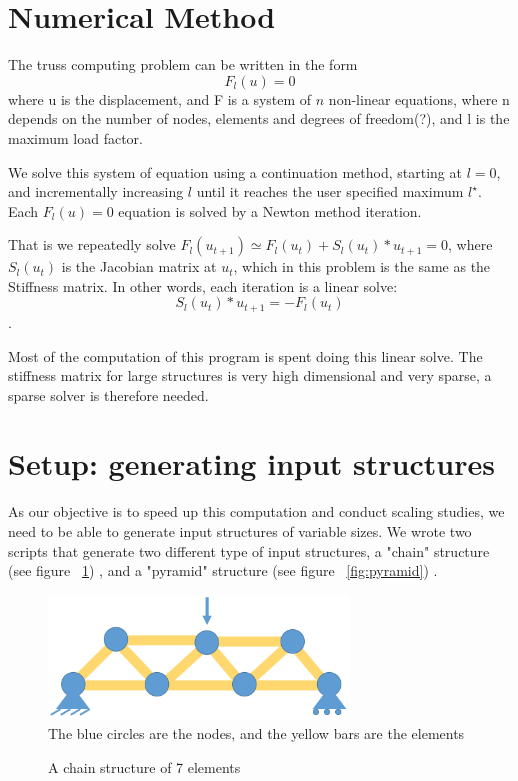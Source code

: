 \documentclass[11pt]{article}
\begin{document}
\section{Numerical Method}

The truss computing problem can be written in the form
$$F_l(u)=0$$
where u is the displacement, and F is a system of $n$ non-linear equations, where n depends on the number of nodes, elements and degrees of freedom(?), and l is the maximum load factor.

We solve this system of equation using a continuation method, starting at $l=0$, and incrementally increasing $l$ until it reaches the user specified maximum $l^{\star}$. 
\\
Each $F_l(u)=0$ equation is solved by a Newton method iteration.

That is we repeatedly solve $F_l(u_{t+1}) \simeq F_l(u_t) + S_l(u_t)*u_{t+1} =0$, where $S_l(u_t)$ is the Jacobian matrix at $u_t$, which in this problem is the same as the Stiffness matrix. 
In other words, each iteration is a linear solve:
$$S_l(u_t)*u_{t+1}=-F_l(u_t)$$.

Most of the computation of this program is spent doing this linear solve. The stiffness matrix for large structures is very high dimensional and very sparse, a sparse solver is therefore needed.

\section{Setup: generating input structures}

As our objective is to speed up this computation and conduct scaling studies, we need to be able to generate input structures of variable sizes.
We wrote two scripts that generate two different type of input structures, a "chain" structure (see figure ~\ref{fig:chain}) , and a "pyramid" structure (see figure ~\ref{fig:pyramid}) .


\begin{figure}[h]
\begin{center}

\caption{A chain structure of 7 elements}
\includegraphics[width=8cm]{chain}
\label{fig:chain}
\\
The blue circles are the nodes, and the yellow bars are the elements
\end{center}

\end{figure}
\end{document}
